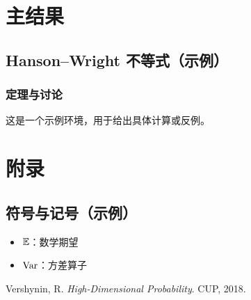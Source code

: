 \documentclass[10pt,openany]{book} %
\begin{document}
\part{主结果}
\chapter{Hanson--Wright 不等式（示例）}
\section{定理与讨论}
\begin{Example}
这是一个示例环境，用于给出具体计算或反例。
\end{Example}

\appendix
\part{附录}
\chapter{符号与记号（示例）}
\begin{itemize}
  \item \(\mathbb{E}\)：数学期望
  \item \(\operatorname{Var}\)：方差算子
\end{itemize}

\backmatter
\begin{thebibliography}{9}
Vershynin, R. \emph{High-Dimensional Probability}. CUP, 2018.
\end{thebibliography}
\end{document}
